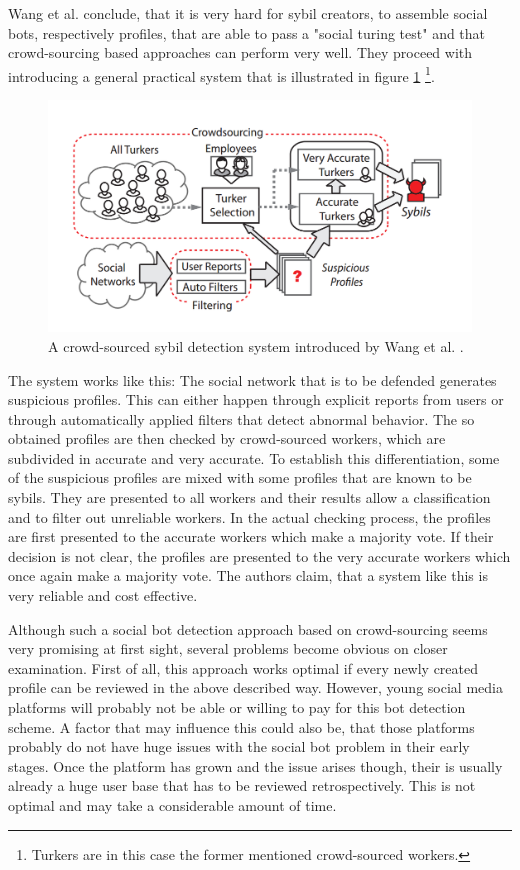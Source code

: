 Wang et al. conclude, that it is very hard for sybil creators, to assemble social bots, respectively profiles, that are able to pass a "social turing test" and that crowd-sourcing based approaches can perform very well. They proceed with introducing a general practical system that is illustrated in figure \ref{crowdsys} \footnote{Turkers are in this case the former mentioned crowd-sourced workers.}.

\begin{figure}
	\centering
	\includegraphics[scale=0.4]{fig/crowdsys}
	\caption{A crowd-sourced sybil detection system introduced by Wang et al. \cite{wangcrowd}.}
	\label{crowdsys}
\end{figure}

The system works like this: The social network that is to be defended generates suspicious profiles. This can either happen through explicit reports from users or through automatically applied filters that detect abnormal behavior. The so obtained profiles are then checked by crowd-sourced workers, which are subdivided in accurate and very accurate. To establish this differentiation, some of the suspicious profiles are mixed with some profiles that are known to be sybils. They are presented to all workers and their results allow a classification and to filter out unreliable workers. In the actual checking process, the profiles are first presented to the accurate workers which make a majority vote. If their decision is not clear, the profiles are presented to the very accurate workers which once again make a majority vote. 
The authors claim, that a system like this is very reliable and cost effective. 

Although such a social bot detection approach based on crowd-sourcing seems very promising at first sight, several problems become obvious on closer examination. First of all, this approach works optimal if every newly created profile can be reviewed in the above described way. However, young social media platforms will probably not be able or willing to pay for this bot detection scheme. A factor that may influence this could also be, that those platforms probably do not have huge issues with the social bot problem in their early stages. Once the platform has grown and the issue arises though, their is usually already a huge user base that has to be reviewed retrospectively. This is not optimal and may take a considerable amount of time.


